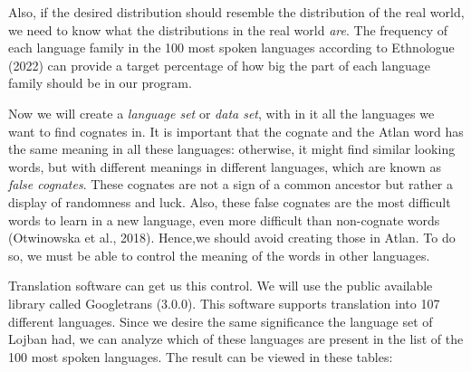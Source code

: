 Also, if the desired distribution should resemble the distribution of the real world, we need to know what the distributions in the real world \textit{are}. The frequency of each language family in the 100 most spoken languages according to Ethnologue (2022) can provide a target percentage of how big the part of each language family should be in our program.  

Now we will create a \textit{language set} or \textit{data set}, with in it all the languages we want to find cognates in. It is important that the cognate and the Atlan word has the same meaning in all these languages: otherwise, it might find similar looking words, but with different meanings in different languages, which are known as \textit{false cognates}. These cognates are not a sign of a common ancestor but rather a display of randomness and luck. Also, these false cognates are the most difficult words to learn in a new language, even more difficult than non-cognate words (Otwinowska et al., 2018). Hence,we should avoid creating those in Atlan. To do so, we must be able to control the meaning of the words in other languages. 

Translation software can get us this control. We will use the public available library called Googletrans (3.0.0). This software supports translation into 107 different languages. Since we desire the same significance the language set of Lojban had, we can analyze which of these languages are present in the list of the 100 most spoken languages. The result can be viewed in these tables: 

